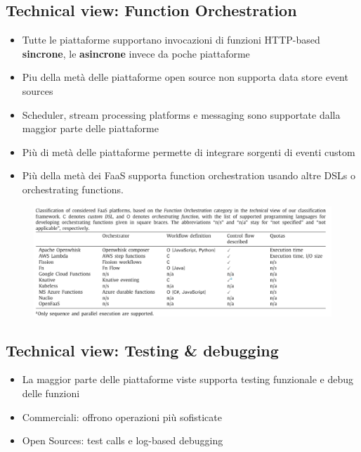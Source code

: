 \documentclass[a4paper, 12pt]{report}
\begin{document}
            \subsection{Technical view: Function Orchestration}
            \begin{itemize}
              \item Tutte le piattaforme supportano invocazioni di funzioni HTTP-based \textbf{sincrone}, le \textbf{asincrone} invece da poche piattaforme
              \item Piu della metà delle piattaforme open source non supporta data store event sources
              \item Scheduler, stream processing platforms e messaging sono supportate dalla maggior parte delle piattaforme
              \item Più di metà delle piattaforme permette di integrare sorgenti di eventi custom
            \end{itemize}
            \begin{itemize}
              \item Più della metà dei FaaS supporta function orchestration usando altre DSLs o orchestrating functions.
            \end{itemize}
            \begin{figure}[h]
              \centering
              \includegraphics[scale=0.4]{Immagini/FunctionOrchestration.png}
            \end{figure}
            \subsection{Technical view: Testing \& debugging}
            \begin{itemize}
              \item La maggior parte delle piattaforme viste supporta testing funzionale e debug delle funzioni
              \item Commerciali: offrono operazioni più sofisticate
              \item Open Sources: test calls e log-based debugging
            \end{itemize}
            \clearpage
\end{document}
